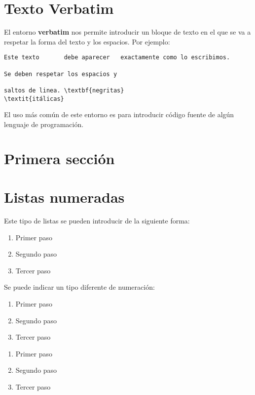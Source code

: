 \documentclass[letterpaper,11pt]{article}
\begin{document}
\section{Texto Verbatim}

El entorno \textbf{verbatim} nos permite introducir un bloque de texto en el que se va a respetar la forma del texto y los espacios. Por ejemplo:

\begin{verbatim}
Este texto       debe aparecer   exactamente como lo escribimos.

Se deben respetar los espacios y

saltos de linea. \textbf{negritas} 
\textit{itálicas}
\end{verbatim}

El uso más común de este entorno es para introducir código fuente de algún lenguaje de programación.

\section{Primera sección}

\section{Listas numeradas}

Este tipo de listas se pueden introducir de la siguiente forma:

\begin{enumerate}
	\item Primer paso
	\item Segundo paso
	\item Tercer paso
\end{enumerate}

Se puede indicar un tipo diferente de numeración:

\begin{enumerate}[I]
	\item Primer paso
	\item Segundo paso
	\item Tercer paso
\end{enumerate}

\bigskip

\begin{enumerate}[a]
	\item Primer paso
	\item Segundo paso
	\item Tercer paso
\end{enumerate}
\end{document}
